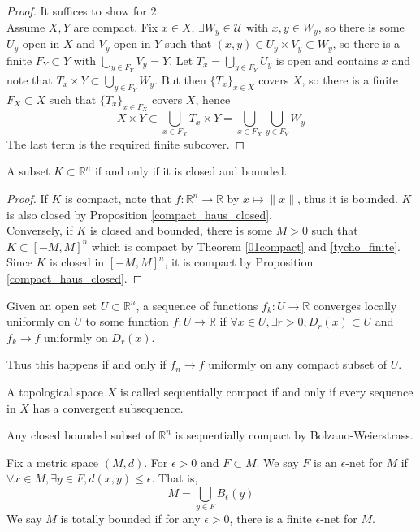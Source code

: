 \begin{proof}
    It suffices to show for $2$.\\
    Assume $X,Y$ are compact.
    Fix $x\in X$, $\exists W_y\in\mathscr U$ with $x,y\in W_y$, so there is some $U_y$ open in $X$ and $V_y$ open in $Y$ such that $(x,y)\in U_y\times V_y\subset W_y$, so there is a finite $F_Y\subset Y$ with $\bigcup_{y\in F_Y}V_y=Y$.
    Let $T_x=\bigcup_{y\in F_Y}U_y$ is open and contains $x$ and note that $T_x\times Y\subset \bigcup_{y\in F_Y}W_y$.
    But then $\{T_x\}_{x\in X}$ covers $X$, so there is a finite $F_X\subset X$ such that $\{T_x\}_{x\in F_X}$ covers $X$, hence
    $$X\times Y\subset \bigcup_{x\in F_X}T_x\times Y=\bigcup_{x\in F_X}\bigcup_{y\in F_Y}W_y$$
    The last term is the required finite subcover. 
\end{proof}
\begin{theorem}
    A subset $K\subset\mathbb R^n$ if and only if it is closed and bounded.
\end{theorem}
\begin{proof}
    If $K$ is compact, note that $f:\mathbb R^n\to\mathbb R$ by $x\mapsto \|x\|$, thus it is bounded.
    $K$ is also closed by Proposition \ref{compact_haus_closed}.\\
    Conversely, if $K$ is closed and bounded, there is some $M>0$ such that $K\subset [-M,M]^n$ which is compact by Theorem \ref{01compact} and \ref{tycho_finite}.
    Since $K$ is closed in $[-M,M]^n$, it is compact by Proposition \ref{compact_haus_closed}.
\end{proof}
\begin{definition}
    Given an open set $U\subset\mathbb R^n$, a sequence of functions $f_k:U\to\mathbb R$ converges locally uniformly on $U$ to some function $f:U\to\mathbb R$ if $\forall x\in U, \exists r>0, D_r(x)\subset U$ and $f_k\to f$ uniformly on $D_r(x)$.
\end{definition}
Thus this happens if and only if $f_n\to f$ uniformly on any compact subset of $U$.
\begin{definition}
    A topological space $X$ is called sequentially compact if and only if every sequence in $X$ has a convergent subsequence.
\end{definition}
\begin{example}
    Any closed bounded subset of $\mathbb R^n$ is sequentially compact by Bolzano-Weierstrass.
\end{example}
\begin{definition}
    Fix a metric space $(M,d)$.
    For $\epsilon>0$ and $F\subset M$.
    We say $F$ is an $\epsilon$-net for $M$ if $\forall x\in M,\exists y\in F,d(x,y)\le \epsilon$.
    That is,
    $$M=\bigcup_{y\in F} B_\epsilon(y)$$
    We say $M$ is totally bounded if for any $\epsilon>0$, there is a finite $\epsilon$-net for $M$.
\end{definition}
